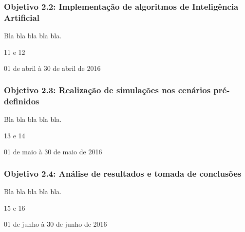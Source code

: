 \subsubsection{\textbf{Objetivo 2.2}: Implementação de algoritmos de Inteligência Artificial}

\begin{description}[leftmargin=!,labelwidth=\widthof{\bfseries Descrição}]
  \item[Descrição] Bla bla bla bla bla.
  \item[Iterações] 11 e 12
  \item[Período]   01 de abril à 30 de abril de 2016
\end{description}

\subsubsection{\textbf{Objetivo 2.3}: Realização de simulações nos cenários pré-definidos}

\begin{description}[leftmargin=!,labelwidth=\widthof{\bfseries Descrição}]
  \item[Descrição] Bla bla bla bla bla.
  \item[Iterações] 13 e 14
  \item[Período]   01 de maio à 30 de maio de 2016
\end{description}

\subsubsection{\textbf{Objetivo 2.4}: Análise de resultados e tomada de conclusões}

\begin{description}[leftmargin=!,labelwidth=\widthof{\bfseries Descrição}]
  \item[Descrição] Bla bla bla bla bla.
  \item[Iterações] 15 e 16
  \item[Período]   01 de junho à 30 de junho de 2016
\end{description}